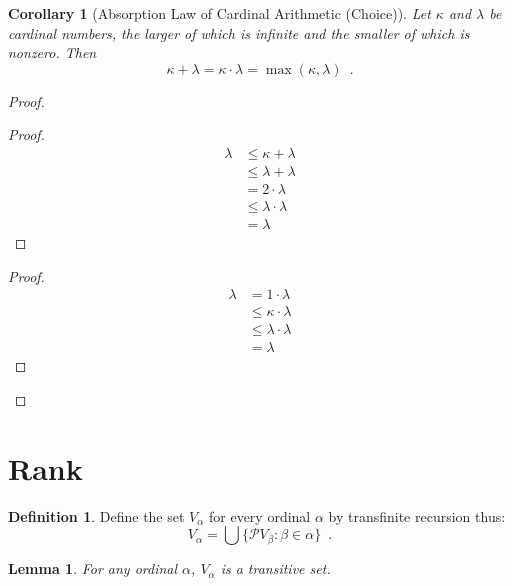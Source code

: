 \documentclass{article}
\let\qed\relax
\newtheorem{lemma}[axiom]{Lemma}
\newtheorem{corollary}{Corollary}[axiom]
\theoremstyle{definition}
\newtheorem{definition}[axiom]{Definition}
\begin{document}
    \begin{corollary}[Absorption Law of Cardinal Arithmetic (Choice)]
        Let $\kappa$ and $\lambda$ be cardinal numbers, the larger of which is infinite and the smaller of
        which is nonzero. Then
        \[ \kappa + \lambda = \kappa \cdot \lambda = \max(\kappa, \lambda) \enspace . \]
    \end{corollary}

    \begin{proof}
        \pf
        \begin{proof}
            \pf
            \begin{align*}
                \lambda & \leq \kappa + \lambda \\
                & \leq \lambda + \lambda \\
                & = 2 \cdot \lambda \\
                & \leq \lambda \cdot \lambda \\
                & = \lambda
            \end{align*}
        \end{proof}
        \begin{proof}
            \pf
            \begin{align*}
                \lambda & = 1 \cdot \lambda \\
                & \leq \kappa \cdot \lambda \\
                & \leq \lambda \cdot \lambda \\
                & = \lambda
            \end{align*}
        \end{proof}
        \qed
    \end{proof}

    \section{Rank}

    \begin{definition}
        Define the set $V_\alpha$ for every ordinal $\alpha$ by transfinite recursion thus:
        \[ V_\alpha = \bigcup \{ \mathcal{P} V_\beta : \beta \in \alpha \} \enspace . \]
    \end{definition}

    \begin{lemma}
        For any ordinal $\alpha$, $V_\alpha$ is a transitive set.
    \end{lemma}
\end{document}
